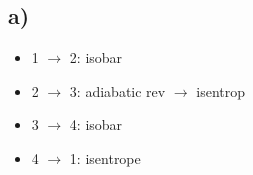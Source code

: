 

\subsection*{a)}

\begin{itemize}
    \item 1 $\rightarrow$ 2: isobar
    \item 2 $\rightarrow$ 3: adiabatic rev $\rightarrow$ isentrop
    \item 3 $\rightarrow$ 4: isobar
    \item 4 $\rightarrow$ 1: isentrope
\end{itemize}